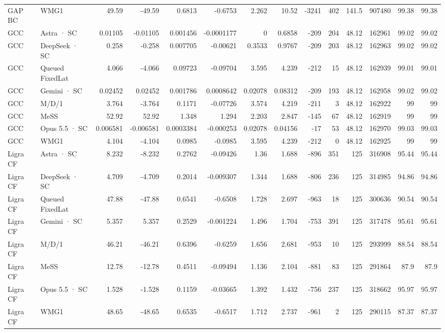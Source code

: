 \begin{tabular}{llrrrrrrrrrrrr}
GAP BC & WMG1 & 49.59 & -49.59 & 0.6813 & -0.6753 & 2.262 & 10.52 & -3241 & 402 & 141.5 & 907480 & 99.38 & 99.38 \\
GCC & Astra · SC & 0.01105 & -0.01105 & 0.001456 & -0.0001177 & 0 & 0.6858 & -209 & 204 & 48.12 & 162961 & 99.02 & 99.02 \\
GCC & DeepSeek · SC & 0.258 & -0.258 & 0.007705 & -0.00621 & 0.3533 & 0.9767 & -209 & 203 & 48.12 & 162963 & 99.02 & 99.02 \\
GCC & Queued FixedLat & 4.066 & -4.066 & 0.09723 & -0.09704 & 3.595 & 4.239 & -212 & 15 & 48.12 & 162939 & 99.01 & 99.01 \\
GCC & Gemini · SC & 0.02452 & 0.02452 & 0.001786 & 0.0008642 & 0.02078 & 0.08312 & -209 & 193 & 48.12 & 162958 & 99.02 & 99.02 \\
GCC & M/D/1 & 3.764 & -3.764 & 0.1171 & -0.07726 & 3.574 & 4.219 & -211 & 3 & 48.12 & 162922 & 99 & 99 \\
GCC & MeSS & 52.92 & 52.92 & 1.348 & 1.294 & 2.203 & 2.847 & -145 & 67 & 48.12 & 162919 & 99 & 99 \\
GCC & Opus 5.5 · SC & 0.006581 & -0.006581 & 0.0003384 & -0.000253 & 0.02078 & 0.04156 & -17 & 53 & 48.12 & 162970 & 99.03 & 99.03 \\
GCC & WMG1 & 4.104 & -4.104 & 0.0985 & -0.0985 & 3.595 & 4.239 & -212 & 0 & 48.12 & 162925 & 99 & 99 \\
Ligra CF & Astra · SC & 8.232 & -8.232 & 0.2762 & -0.09426 & 1.36 & 1.688 & -896 & 351 & 125 & 316908 & 95.44 & 95.44 \\
Ligra CF & DeepSeek · SC & 4.709 & -4.709 & 0.2014 & -0.009307 & 1.344 & 1.688 & -806 & 236 & 125 & 314985 & 94.86 & 94.86 \\
Ligra CF & Queued FixedLat & 47.88 & -47.88 & 0.6541 & -0.6508 & 1.728 & 2.697 & -963 & 18 & 125 & 300636 & 90.54 & 90.54 \\
Ligra CF & Gemini · SC & 5.357 & 5.357 & 0.2529 & -0.001224 & 1.496 & 1.704 & -753 & 391 & 125 & 317478 & 95.61 & 95.61 \\
Ligra CF & M/D/1 & 46.21 & -46.21 & 0.6396 & -0.6259 & 1.656 & 2.681 & -953 & 10 & 125 & 293999 & 88.54 & 88.54 \\
Ligra CF & MeSS & 12.78 & -12.78 & 0.4511 & -0.09494 & 1.136 & 2.104 & -881 & 83 & 125 & 291864 & 87.9 & 87.9 \\
Ligra CF & Opus 5.5 · SC & 1.528 & -1.528 & 0.1159 & -0.03665 & 1.392 & 1.432 & -756 & 237 & 125 & 318662 & 95.97 & 95.97 \\
Ligra CF & WMG1 & 48.65 & -48.65 & 0.6535 & -0.6517 & 1.712 & 2.737 & -961 & 2 & 125 & 290115 & 87.37 & 87.37 \\

\end{tabular}
